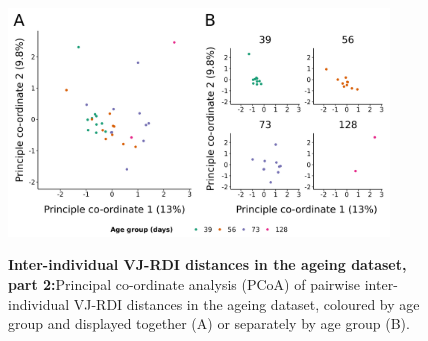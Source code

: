 \begin{figure}
\centering
\includegraphics[width = 0.9\textwidth]{_Figures/png/ageing-rdi-VJ-individual-pcoa}
\begin{subfigure}{0em}
\label{fig:igseq-ageing-rdi-VJ-individual-pcoa-all}
\end{subfigure}
\begin{subfigure}{0em}
\label{fig:igseq-ageing-rdi-VJ-individual-pcoa-facet}
\end{subfigure}
\caption[Inter-individual VJ-RDI distances in the \igseq ageing dataset, part 2]{\textbf{Inter-individual VJ-RDI distances in the \igseq ageing dataset, part 2:}Principal co-ordinate analysis (PCoA) of pairwise inter-individual VJ-RDI distances in the \igseq ageing dataset, coloured by age group and displayed together (A) or separately by age group (B).}
\label{fig:igseq-ageing-rdi-VJ-individual-pcoa}
\end{figure}

\FloatBarrier
\clearpage